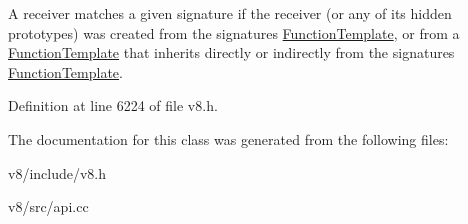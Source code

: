 A receiver matches a given signature if the receiver (or any of its hidden prototypes) was created from the signature\textquotesingle{}s \mbox{\hyperlink{classv8_1_1FunctionTemplate}{Function\+Template}}, or from a \mbox{\hyperlink{classv8_1_1FunctionTemplate}{Function\+Template}} that inherits directly or indirectly from the signature\textquotesingle{}s \mbox{\hyperlink{classv8_1_1FunctionTemplate}{Function\+Template}}. 

Definition at line 6224 of file v8.\+h.



The documentation for this class was generated from the following files\+:\begin{DoxyCompactItemize}
\item 
v8/include/v8.\+h\item 
v8/src/api.\+cc\end{DoxyCompactItemize}
